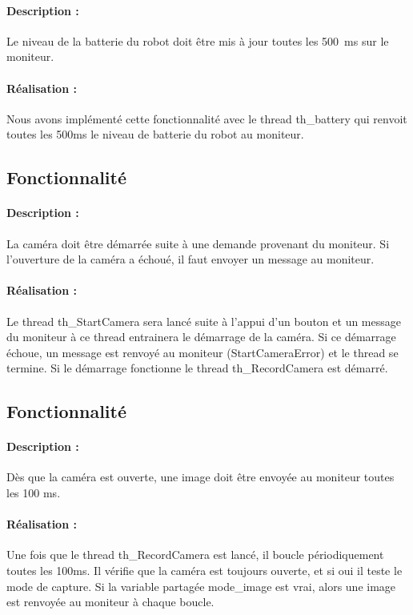 \documentclass[11pt, a4paper]{paper}
\newcounter{cptreq}
\begin{document}
{{\paragraph{Description :} Le niveau de la batterie du robot doit être mis à jour toutes les 500~ms sur le moniteur.

\paragraph{\color{black}Réalisation :}  {\color{black} Nous avons implémenté cette fonctionnalité avec le thread th\_battery qui renvoit toutes les 500ms le niveau de batterie du robot au moniteur.}
\subsection{Fonctionnalité \thecptreq}

\paragraph{Description :} La caméra doit être démarrée suite à une demande provenant du moniteur. Si l'ouverture de la  caméra a échoué, il faut envoyer un message au moniteur.

\paragraph{\color{black}Réalisation :}  {\color{black} Le thread th\_StartCamera sera lancé suite à l'appui d'un bouton et un message du moniteur à ce thread entrainera le démarrage de la caméra. Si ce démarrage échoue, un message est renvoyé au moniteur (StartCameraError) et le thread se termine. Si le démarrage fonctionne le thread th\_RecordCamera est démarré.}
\subsection{Fonctionnalité \thecptreq}

\paragraph{Description :} Dès que la caméra est ouverte, une image doit être envoyée au moniteur toutes les 100 ms.

\paragraph{\color{black}Réalisation :}  {\color{black} Une fois que le thread th\_RecordCamera est lancé, il boucle périodiquement toutes les 100ms. Il vérifie que la caméra est toujours ouverte, et si oui il teste le mode de capture. Si la variable partagée mode\_image est vrai, alors une image est renvoyée au moniteur à chaque boucle.}
}}
\end{document}
